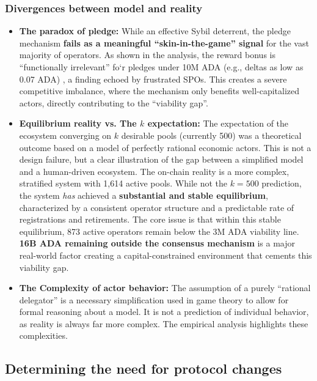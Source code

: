 \documentclass[11pt, letterpaper]{article}
\begin{document}
\subsubsection{Divergences between model and reality}

\begin{itemize}
	\item \textbf{The paradox of pledge:} While an effective Sybil deterrent, the pledge mechanism
	      \textbf{fails as a meaningful ``skin-in-the-game'' signal} for the vast majority of operators. As shown
	      in the analysis, the reward bonus is ``functionally irrelevant'' fo`r pledges under 10M ADA (e.g., deltas
	      as low as 0.07 ADA) , a finding echoed by frustrated SPOs. This creates a severe competitive imbalance,
	      where the mechanism only benefits well-capitalized actors, directly contributing to the ``viability gap''.
	\item \textbf{Equilibrium reality vs. The $k$ expectation:} The expectation of the ecosystem converging
	      on $k$ desirable pools (currently 500) was a theoretical outcome based on a model of perfectly rational
	      economic actors. This is not a design failure, but a clear illustration of the gap between a simplified
	      model and a human-driven ecosystem. The on-chain reality is a more complex, stratified system with 1,614
	      active pools. While not the $k=500$ prediction, the system \textit{has} achieved a
	      \textbf{substantial and stable equilibrium}, characterized by a consistent operator structure and
	      a predictable rate of registrations and retirements. The core issue is that within this stable equilibrium,
	      873 active operators remain below the 3M ADA viability line.
	      \textbf{16B ADA remaining outside the consensus mechanism} is a major real-world factor creating a
	      capital-constrained environment that cements this viability gap.
	\item \textbf{The Complexity of actor behavior:} The assumption of a purely ``rational delegator'' is a
	      necessary simplification used in game theory to allow for formal reasoning about a model. It is not a
	      prediction of individual behavior, as reality is always far more complex. The empirical analysis highlights
	      these complexities.
\end{itemize}

\subsection{Determining the need for protocol changes}
\label{sec:need-for-changes}
\end{document}
